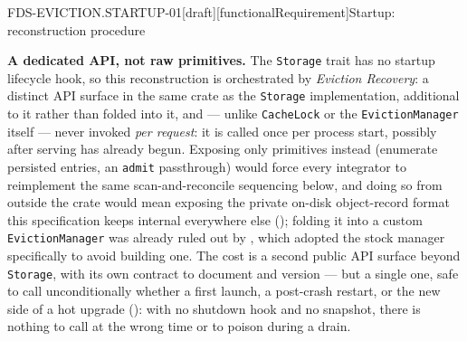 \begin{requirement}{FDS-EVICTION.STARTUP-01}[draft][functionalRequirement]{Startup: reconstruction procedure}


  \textbf{A dedicated API, not raw primitives.} The \texttt{Storage} trait
  has no startup lifecycle hook, so this reconstruction is orchestrated by
  \emph{Eviction Recovery}: a distinct API surface in the same crate as the
  \texttt{Storage} implementation, additional to it rather than folded into
  it, and --- unlike \texttt{CacheLock} or the \texttt{EvictionManager}
  itself --- never invoked \emph{per request}: it is called once per process
  start, possibly after serving has already begun. Exposing only primitives
  instead (enumerate persisted entries, an \texttt{admit} passthrough) would
  force every integrator to reimplement the same scan-and-reconcile
  sequencing below, and doing so from outside the crate would mean exposing
  the private on-disk object-record format this specification keeps
  internal everywhere else (); folding it
  into a custom \texttt{EvictionManager} was already ruled out by
  , which adopted the stock manager
  specifically to avoid building one. The cost is a second public API
  surface beyond \texttt{Storage}, with its own contract to document and
  version --- but a single one, safe to call unconditionally whether a
  first launch, a post-crash restart, or the new side of a hot upgrade
  (): with no shutdown hook and no
  snapshot, there is nothing to call at the wrong time or to poison during
  a drain.


\end{requirement}
